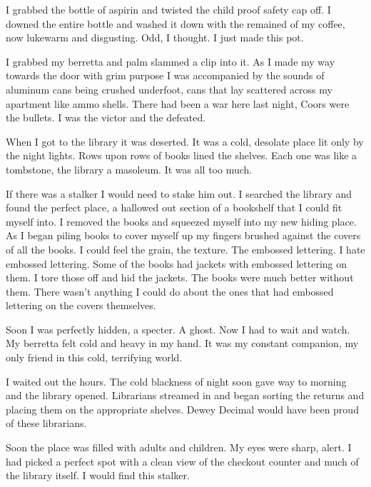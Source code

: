 I grabbed the bottle of aspirin and twisted the child proof safety
cap off. I downed the entire bottle and washed it down with the
remained of my coffee, now lukewarm and disgusting. Odd, I thought.
I just made this pot.



I grabbed my berretta and palm slammed a clip into it. As I made my
way towards the door with grim purpose I was accompanied by the
sounds of aluminum cans being crushed underfoot, cans that lay
scattered across my apartment like ammo shells. There had been a
war here last night, Coors were the bullets. I was the victor and
the defeated.



When I got to the library it was deserted. It was a cold, desolate
place lit only by the night lights. Rows upon rows of books lined
the shelves. Each one was like a tombstone, the library a masoleum.
It was all too much.



If there was a stalker I would need to stake him out. I searched
the library and found the perfect place, a hallowed out section of
a bookshelf that I could fit myself into. I removed the books and
squeezed myself into my new hiding place. As I began piling books
to cover myself up my fingers brushed against the covers of all the
books. I could feel the grain, the texture. The embossed lettering.
I hate embossed lettering. Some of the books had jackets with
embossed lettering on them. I tore those off and hid the jackets.
The books were much better without them. There wasn't anything I
could do about the ones that had embossed lettering on the covers
themselves.



Soon I was perfectly hidden, a specter. A ghost. Now I had to wait
and watch. My berretta felt cold and heavy in my hand. It was my
constant companion, my only friend in this cold, terrifying
world.



I waited out the hours. The cold blackness of night soon gave way
to morning and the library opened. Librarians streamed in and began
sorting the returns and placing them on the appropriate shelves.
Dewey Decimal would have been proud of these librarians.



Soon the place was filled with adults and children. My eyes were
sharp, alert. I had picked a perfect spot with a clean view of the
checkout counter and much of the library itself. I would find this
stalker.



